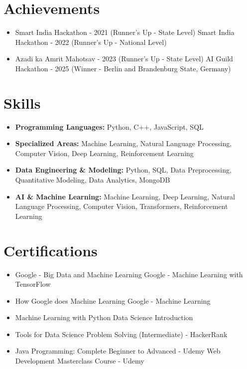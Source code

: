\documentclass[a4paper,10pt]{article}
\begin{document}
\section*{Achievements}
\begin{itemize}
\item Smart India Hackathon - 2021 (Runner's Up - State Level) \hfill Smart India Hackathon - 2022 (Runner's Up - National Level)
\item Azadi ka Amrit Mahotsav - 2023 (Runner's Up - State Level) \hfill AI Guild Hackathon - 2025 (Winner - Berlin and Brandenburg State, Germany)
\end{itemize}

\section*{Skills}
\begin{itemize}
  \item \textbf{Programming Languages:} Python, C++, JavaScript, SQL
  \item \textbf{Specialized Areas:} Machine Learning, Natural Language Processing, Computer Vision, Deep Learning, Reinforcement Learning
  \item \textbf{Data Engineering \& Modeling:} Python, SQL, Data Preprocessing, Quantitative Modeling, Data Analytics, MongoDB
  \item \textbf{AI \& Machine Learning:} Machine Learning, Deep Learning, Natural Language Processing, Computer Vision, Transformers, Reinforcement Learning
\end{itemize}

\section*{Certifications}
\begin{itemize}
\item Google - Big Data and Machine Learning \hfill Google - Machine Learning with TensorFlow
\item How Google does Machine Learning \hfill Google - Machine Learning
\item Machine Learning with Python \hfill Data Science Introduction
\item Tools for Data Science \hfill Problem Solving (Intermediate) - HackerRank
\item Java Programming: Complete Beginner to Advanced - Udemy \hfill Web Development Masterclass Course - Udemy
\end{itemize}
\end{document}
